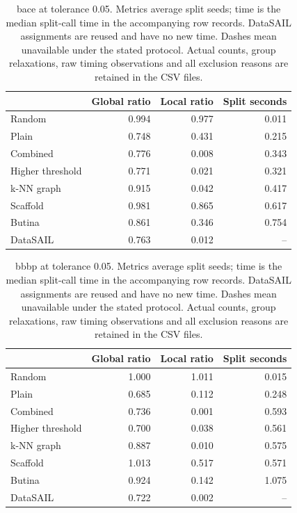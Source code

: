 \begin{table}[htbp]\centering\small
\begin{tabular}{lrrr}
\toprule
 & Global ratio & Local ratio & Split seconds \\
\midrule
Random & 0.994 & 0.977 & 0.011 \\
Plain & 0.748 & 0.431 & 0.215 \\
Combined & 0.776 & 0.008 & 0.343 \\
Higher threshold & 0.771 & 0.021 & 0.321 \\
k-NN graph & 0.915 & 0.042 & 0.417 \\
Scaffold & 0.981 & 0.865 & 0.617 \\
Butina & 0.861 & 0.346 & 0.754 \\
DataSAIL & 0.763 & 0.012 & -- \\
\bottomrule
\end{tabular}

\caption{bace at tolerance 0.05. Metrics average split seeds; time is the median split-call time in the accompanying row records. DataSAIL assignments are reused and have no new time. Dashes mean unavailable under the stated protocol. Actual counts, group relaxations, raw timing observations and all exclusion reasons are retained in the CSV files.}\end{table}
\begin{table}[htbp]\centering\small
\begin{tabular}{lrrr}
\toprule
 & Global ratio & Local ratio & Split seconds \\
\midrule
Random & 1.000 & 1.011 & 0.015 \\
Plain & 0.685 & 0.112 & 0.248 \\
Combined & 0.736 & 0.001 & 0.593 \\
Higher threshold & 0.700 & 0.038 & 0.561 \\
k-NN graph & 0.887 & 0.010 & 0.575 \\
Scaffold & 1.013 & 0.517 & 0.571 \\
Butina & 0.924 & 0.142 & 1.075 \\
DataSAIL & 0.722 & 0.002 & -- \\
\bottomrule
\end{tabular}

\caption{bbbp at tolerance 0.05. Metrics average split seeds; time is the median split-call time in the accompanying row records. DataSAIL assignments are reused and have no new time. Dashes mean unavailable under the stated protocol. Actual counts, group relaxations, raw timing observations and all exclusion reasons are retained in the CSV files.}\end{table}
